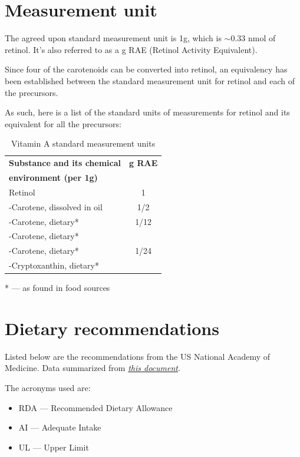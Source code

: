 \documentclass{book}
\begin{document}
\begin{sloppypar}
\section{Measurement unit}
The agreed upon standard measurement unit is 1\textmu g, which is $\sim$0.33 nmol of retinol. It's also referred to as a \textmu g RAE (Retinol Activity Equivalent).

Since four of the carotenoids can be converted into retinol, an equivalency has been established between the standard measurement unit for retinol and each of the precursors.

As such, here is a list of the standard units of measurements for retinol and its equivalent for all the precursors:

\begin{table}[ht]
	\caption{Vitamin A standard measurement units}
	\centering \begin{tabular}{| l | c |}
		\hline
		\textbf{Substance and its chemical} & \textbf{\textmu g RAE}\\
		\textbf{environment (per 1\textmu g)} &\\ \hline
		Retinol & 1\\ \hline
		\textbeta -Carotene, dissolved in oil & 1/2\\ \hline
		\textbeta -Carotene, dietary* & 1/12\\ \hline
		\textalpha -Carotene, dietary* &\\
		\textgamma -Carotene, dietary*& 1/24\\
		\textbeta -Cryptoxanthin, dietary* &\\ \hline
	\end{tabular}
\end{table}

* --- as found in food sources
\newpage

\section{Dietary recommendations}
Listed below are the recommendations from the US National Academy of Medicine. Data summarized from \href{https://nap.nationalacademies.org/read/10026/chapter/6}{\textit{this document}}.

The acronyms used are:
\begin{itemize}
	\item RDA --- Recommended Dietary Allowance
	\item AI --- Adequate Intake
	\item UL --- Upper Limit
\end{itemize}


\end{sloppypar}
\end{document}
